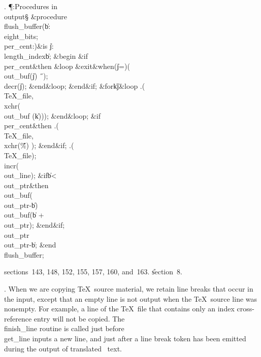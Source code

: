 . \P\?:Procedures in \\{output}\X\S\?\6
\&{procedure}\8\1\\{flush\_buffer}\?(\?\|b\?:\?\\{eight\_bits};\?\,\1\?%
\\{per\_cent}\?:\?\?\2)\?\2\8\&{is}\8\1\6
\|j\?:\?\\{length\_index}\?\K\?\|b;\6
\4\&{begin}\6
\&{if}\1\1\?\8\R\?\\{per\_cent}\2\8\&{then}\6
\1\&{loop}\6
\?\&{exit}\8\&{when}\8\1(\?\|j\?=\?\2)\ORE\1(\?\\{out\_buf}\?\1(\?\|j\?\2)\I%
\?\H{\ }\?\2)\?;\6
\\{decr}\?\1(\?\|j\?\2)\?;\2\6
\&{end}\8\&{loop};\2\6
\&{end}\8\2\&{if}\1;\6
\1\&{for}\8\|k\?\in{}\?\to\?\|j\8\&{loop}\6
\?.\?\?\1(\?\\{TeX\_file}\?,\?\\{xchr}\?\1(\?\\{out\_buf}%
\?\1(\?\|k\?\2)\2)\2)\?;\2\6
\&{end}\8\&{loop};\6
\&{if}\1\1\8\\{per\_cent}\2\8\&{then}\6
\?.\?\?\1(\?\\{TeX\_file}\?,\?\\{xchr}\?\1(\?\H{\%}\?\2)%
\2)\?;\2\6
\&{end}\8\2\&{if}\1;\6
\?.\?\?\1(\?\\{TeX\_file}\?\2)\?;\5
\\{incr}\?\1(\?\\{out\_line}\?\2)\?;\6
\&{if}\1\1\8\|b\?<\?\\{out\_ptr}\2\8\&{then}\6
\\{out\_buf}\?\1(\?\to\?\\{out\_ptr}\?-\?\|b\?\2)\K\?\\{out\_buf}\?\1(\?\|b%
\?+\?\to\?\\{out\_ptr}\?\2)\?;\2\6
\&{end}\8\2\&{if}\1;\6
\\{out\_ptr}\?\K\?\\{out\_ptr}\?-\?\|b;\2\6
\&{end}\8\\{flush\_buffer};\par
\A sections~143, 148, 152, 155, 157, 160, and~163.
\U section~8\*.\fi

. When we are copying \TeX\ source material, we retain line breaks
that occur in the input, except that an empty line is not
output when the \TeX\ source line was nonempty. For example, a line
of the \TeX\ file that contains only an index cross-reference entry
will not be copied. The \\{finish\_line} routine is called just before
\\{get\_line} inputs a new line, and just after a line break token has
been emitted during the output of translated \ADA\ text.

